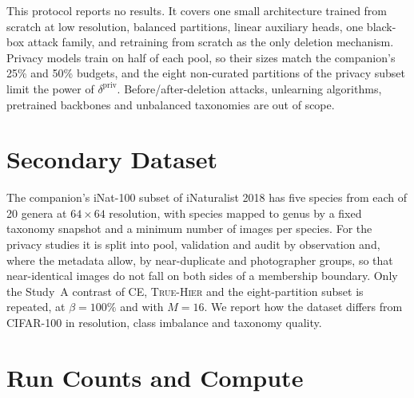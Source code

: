 \documentclass{article} %
\newcommand{\cn}[1]{\textsc{#1}}
\begin{document}
This protocol reports no results. It covers one small architecture trained from scratch at low resolution, balanced partitions, linear auxiliary heads, one black-box attack family, and retraining from scratch as the only deletion mechanism. Privacy models train on half of each pool, so their sizes match the companion's 25\% and 50\% budgets, and the eight non-curated partitions of the privacy subset limit the power of $\delta^{\mathrm{priv}}$. Before/after-deletion attacks, unlearning algorithms, pretrained backbones and unbalanced taxonomies are out of scope.




\appendix
\section{Secondary Dataset}
\label{app:inat}

The companion's iNat-100 subset of iNaturalist 2018 \citep{vanhorn2018inat} has five species from each of 20 genera at $64\times64$ resolution, with species mapped to genus by a fixed taxonomy snapshot and a minimum number of images per species. For the privacy studies it is split into pool, validation and audit by observation and, where the metadata allow, by near-duplicate and photographer groups, so that near-identical images do not fall on both sides of a membership boundary. Only the Study~A contrast of \cn{CE}, \cn{True-Hier} and the eight-partition subset is repeated, at $\beta=100\%$ and with $M=16$. We report how the dataset differs from CIFAR-100 in resolution, class imbalance and taxonomy quality.

\section{Run Counts and Compute}
\label{app:compute}
\end{document}

